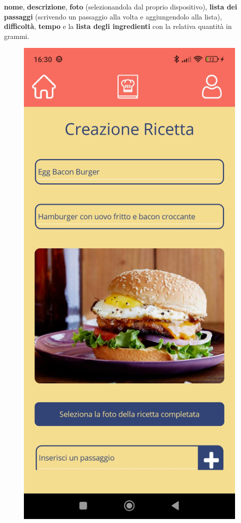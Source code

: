 ﻿\documentclass[a4paper,12pt]{report}
\begin{document}
\textbf{nome}, \textbf{descrizione}, \textbf{foto} (selezionandola dal proprio dispositivo), \textbf{lista dei passaggi} (scrivendo un passaggio alla volta e aggiungendolo alla lista), \textbf{difficoltà}, \textbf{tempo} e la \textbf{lista degli ingredienti} con la relativa quantità in grammi.\\
\begin{figure}[h!]
    \begin{minipage}{.5\textwidth}
        \centering
        \includegraphics[width=0.9\linewidth]{app_images/RecipeCreation.jpg}

\end{minipage}
\end{figure}
\end{document}
